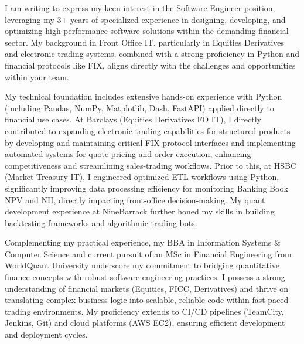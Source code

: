 \documentclass[11pt, a4paper]{article} %
\begin{document}
\medskip %

I am writing to express my keen interest in the Software Engineer position, leveraging my 3+ years of specialized experience in designing, developing, and optimizing high-performance software solutions within the demanding financial sector. My background in Front Office IT, particularly in Equities Derivatives and electronic trading systems, combined with a strong proficiency in Python and financial protocols like FIX, aligns directly with the challenges and opportunities within your team.

My technical foundation includes extensive hands-on experience with Python (including Pandas, NumPy, Matplotlib, Dash, FastAPI) applied directly to financial use cases. At Barclays (Equities Derivatives FO IT), I directly contributed to expanding electronic trading capabilities for structured products by developing and maintaining critical FIX protocol interfaces and implementing automated systems for quote pricing and order execution, enhancing competitiveness and streamlining sales-trading workflows. Prior to this, at HSBC (Market Treasury IT), I engineered optimized ETL workflows using Python, significantly improving data processing efficiency for monitoring Banking Book NPV and NII, directly impacting front-office decision-making. My quant development experience at NineBarrack further honed my skills in building backtesting frameworks and algorithmic trading bots.

Complementing my practical experience, my BBA in Information Systems \& Computer Science and current pursuit of an MSc in Financial Engineering from WorldQuant University underscore my commitment to bridging quantitative finance concepts with robust software engineering practices. I possess a strong understanding of financial markets (Equities, FICC, Derivatives) and thrive on translating complex business logic into scalable, reliable code within fast-paced trading environments. My proficiency extends to CI/CD pipelines (TeamCity, Jenkins, Git) and cloud platforms (AWS EC2), ensuring efficient development and deployment cycles.
\end{document}
